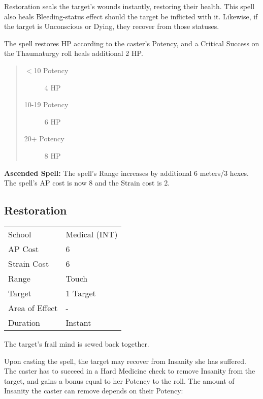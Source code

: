 \documentclass[11pt,a4paper,twocolumn]{book}
\begin{document}
Restoration seals the target's wounds instantly, restoring their health. This spell also heals Bleeding-status effect should the target be inflicted with it. Likewise, if the target is Unconscious or Dying, they recover from those statuses.

The spell restores HP according to the caster's Potency, and a Critical Success on the Thaumaturgy roll heals additional 2 HP.

\begin{quote}
	\begin{description}
		\item[$<$10 Potency] 	4 HP
		\item[10-19 Potency] 	6 HP
		\item[20+ Potency] 	    8 HP	
	\end{description}	
\end{quote}

\bigskip

\textbf{Ascended Spell:} The spell's Range increases by additional 6 meters/3 hexes. The spell's AP cost is now 8 and the Strain cost is 2.

\bigskip

\subsection*{Restoration}
{
	\begin{tabu} to 75mm{| X[l,4] | X[l,7] |}
		\hline
		School 			& Medical (INT) 		\\
		AP Cost	      	& 6 					\\
		Strain Cost     & 6 					\\
		Range     		& Touch					\\
		Target      	& 1 Target				\\
		Area of Effect  & -  	 				\\
		Duration     	& Instant				\\ \hline
	\end{tabu}
	
}

\medskip

The target's frail mind is sewed back together.

Upon casting the spell, the target may recover from Insanity she has suffered. The caster has to succeed in a Hard Medicine check to remove Insanity from the target, and gains a bonus equal to her Potency to the roll. The amount of Insanity the caster can remove depends on their Potency:
\end{document}
